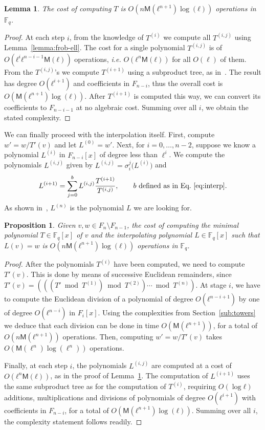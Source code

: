 \documentclass{lms}
\newtheorem{lem}[thm]{Lemma}
\newtheorem{prop}[thm]{Proposition}
\def\cout#1{\mathsf{#1}}
\newcommand{\F}{\mathbb{F}}
\newcommand{\MM}{\cout{M}}
\begin{document}
\begin{lem}\label{lemma:interpolation:minpoly}
  The cost of computing $T$ is $O(n\MM(ℓ^{n+1})\log(ℓ))$
  operations in $\F_q$.
\end{lem}

\begin{proof}
  At each step $i$, from the knowledge of $T^{(i)}$ we compute all
  $T^{(i,j)}$ using Lemma~\ref{lemma:frob-ell}. The cost for a single
  polynomial $T^{(i,j)}$ is of $O(ℓ^iℓ^{n-i-1}\MM(ℓ))$ operations,
  \emph{i.e.} $O(ℓ^n\MM(ℓ))$ for all $O(\ell)$ of them.
  From the $T^{(i,j)}$'s we compute $T^{(i+1)}$ using a subproduct
  tree, as in~\cite[Lemma~10.4]{vzGG}. The result has degree
  $O(ℓ^{i+1})$ and coefficients in $F_{n-i}$, thus the overall cost is
  $O(\MM(ℓ^{n+1})\log(ℓ))$. After $T^{(i+1)}$ is computed this way, we
  can convert its coefficients to $F_{n-i-1}$ at no algebraic cost.
  Summing over all $i$, we obtain the stated complexity.
\end{proof}

We can finally proceed with the interpolation itself. First, compute
$w' = w/T'(v)$ and let $L^{(0)}=w'$.  Next, for $i=0,\dots,n-2$,
suppose we know a polynomial $L^{(i)}$ in $F_{n-i}[x]$ of degree less
than $\ell^i$. We compute the polynomials $L^{(i,j)}$ given by
$L^{(i,j)}= \sigma_i^j\bigl(L^{(i)}\bigr)$ and
\[L^{(i+1)} = \sum_{j=0}^{b} L^{(i,j)}\frac{T^{(i+1)}}{T^{(i,j)}},
  \qquad\text{$b$ defined as in Eq.~\eqref{eq:interp}}.\]
As shown in~\cite{df10}, $L^{(n)}$ is the
polynomial $L$ we are looking for.

\begin{prop}
  Given $v,w∈F_n\setminus F_{n-1}$, the cost of computing the
  minimal polynomial $T∈\F_q[x]$ of $v$ and the interpolating
  polynomial $L∈\F_q[x]$ such that $L(v)=w$ is $O(n\MM(ℓ^{n+1})\log(ℓ))$
  operations in $\F_q$.
\end{prop}
\begin{proof}
  After the polynomials $T^{(i)}$ have been computed, we need to
  compute $T'(v)$. This is done by means of successive Euclidean
  remainders, since
  $T'(v) = (((T' \bmod T^{(1)}) \bmod T^{(2)}) \cdots \bmod T^{(n)})$.
  At stage $i$, we have to compute the Euclidean division of a
  polynomial of degree $O(ℓ^{n-i+1})$ by one of degree $O(ℓ^{n-i})$ in
  $F_i[x]$. Using the complexities from Section~\ref{sub:towers} we
  deduce that each division can be done in time $O(\MM(ℓ^{n+1}))$, for
  a total of $O(n\MM(ℓ^{n+1}))$ operations. Then, computing
  $w' = w/T'(v)$ takes $O(\MM(\ell^n)\log(\ell^n))$ operations.

  Finally, at each step $i$, the polynomials $L^{(i,j)}$ are computed
  at a cost of $O(ℓ^n\MM(ℓ))$, as in the proof of
  Lemma~\ref{lemma:interpolation:minpoly}.  The computation of
  $L^{(i+1)}$ uses the same subproduct tree as for the computation of
  $T^{(i)}$, requiring $O(\log ℓ)$ additions, multiplications and
  divisions of polynomials of degree $O(ℓ^{i+1})$ with coefficients in
  $F_{n-i}$, for a total of $O(\MM(ℓ^{n+1})\log(ℓ))$. Summing over all
  $i$, the complexity statement follows readily.
\end{proof}
\end{document}
